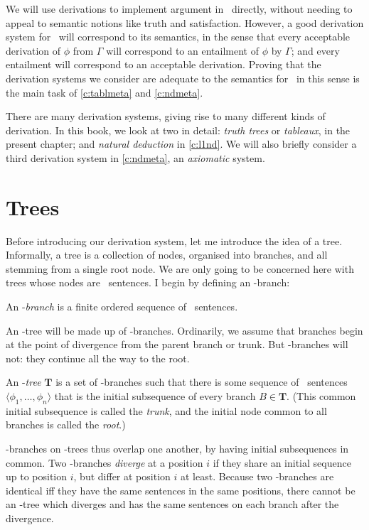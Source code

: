 We will use derivations to implement argument in \lone\ directly, without needing to appeal to semantic notions like truth and satisfaction. However, a good derivation system for \lone\ will correspond to its semantics, in the sense that every acceptable derivation of $\phi$ from $\Gamma$ will correspond to an entailment of $\phi$ by $\Gamma$; and every entailment will correspond to an acceptable derivation. Proving that the derivation systems we consider are adequate to the semantics for \lone\ in this sense is the main task of \autoref{c:tablmeta} and \autoref{c:ndmeta}.

There are many derivation systems, giving rise to many different kinds of derivation. In this book, we look at two in detail: \emph{truth trees} or \emph{tableaux}, in the present chapter; and \emph{natural deduction} in \autoref{c:l1nd}. We will also briefly consider a third derivation system in \autoref{c:ndmeta}, an \emph{axiomatic} system.

\section{Trees}

Before introducing our derivation system, let me introduce the idea of a tree. Informally, a tree is a collection of nodes, organised into branches, and all stemming from a single root node. We are only going to be concerned here with trees whose nodes are \lone\ sentences. I begin by defining an \lone-branch: \begin{definition}\label{lonebranch}
	An \lone-\emph{branch} is a finite ordered sequence of \lone\ sentences.
\end{definition}
An \lone-tree will be made up of \lone-branches. Ordinarily, we assume that branches begin at the point of divergence from the parent branch or trunk. But \lone-branches will not: they continue all the way to the root. \begin{definition}\label{l1tree}
	An \lone-\emph{tree} $\mathbf{T}$ is a set of \lone-branches such that there is some sequence of \lone\ sentences $\langle \phi_{1},…,\phi_{n}\rangle$ that is the initial subsequence of every branch $B \in \mathbf{T}$. (This common initial subsequence is called the \emph{trunk}, and the initial node common to all branches is called the \emph{root}.)
\end{definition} 
\lone-branches on \lone-trees thus overlap one another, by having initial subsequences in common. Two \lone-branches \emph{diverge} at a position $i$ if they share an initial sequence up to position $i$, but differ at position $i$ at least. Because two \lone-branches are identical iff they have the same sentences in the same positions, there cannot be an \lone-tree which diverges and has the same sentences on each branch after the divergence.


